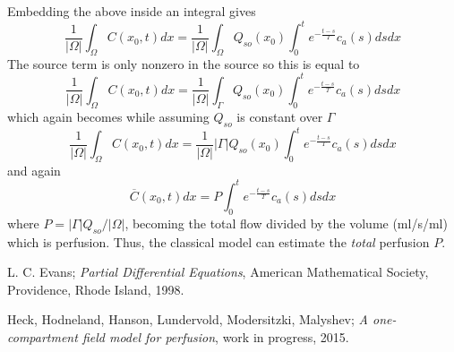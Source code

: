 \documentclass[paper=a4, fontsize=12pt,parskip=half,draft,headings=small]{scrartcl}
\begin{document}
Embedding the above inside an integral gives
		$$
		\frac{1}{|\Omega|}\int_\Omega C(x_0,t)dx = \frac{1}{|\Omega|}\int_\Omega Q_{so}(x_0)\int_0^{t}e^{-\frac{t-s}{T}}c_a(s)dsdx
		$$
		The source term is only nonzero in the source so this is equal to
		$$
		\frac{1}{|\Omega|}\int_\Omega C(x_0,t)dx = \frac{1}{|\Omega|}\int_\Gamma Q_{so}(x_0)\int_0^{t}e^{-\frac{t-s}{T}}c_a(s)dsdx
		$$
which again becomes while assuming $Q_{so}$ is constant over $\Gamma$
		$$
		\frac{1}{|\Omega|}\int_\Omega C(x_0,t)dx = \frac{1}{|\Omega|} |\Gamma| Q_{so}(x_0)\int_0^{t}e^{-\frac{t-s}{T}}c_a(s)dsdx
		$$
		and again
		$$
		 \overline{C}(x_0,t)dx = P\int_0^{t}e^{-\frac{t-s}{T}}c_a(s)dsdx
		$$
		where $P = |\Gamma|Q_{so}/|\Omega|$, becoming the total flow divided by the volume (ml/s/ml) which is perfusion. Thus, the classical model can estimate the \textit{total} perfusion $P$.
		
		
	\begin{thebibliography}{9}
		L. C. Evans;
		\emph{Partial Differential Equations},
		American Mathematical Society,
		Providence, Rhode Island,
		1998.
		
		Heck, Hodneland, Hanson, Lundervold, Modersitzki, Malyshev;
		\emph{A one-compartment field model for perfusion},
		work in progress,
		2015.
	\end{thebibliography}
	
	\begin{flushright}
		\signature{28ex}
	\end{flushright}
\end{document}

